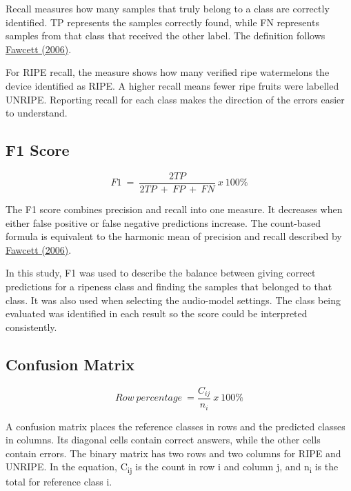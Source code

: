 \begin{thesisprose}
Recall measures how many samples that truly belong to a class are correctly identified. TP represents the samples correctly found, while FN represents samples from that class that received the other label. The definition follows \hyperlink{cite.fawcett2006}{Fawcett (2006)}.

For RIPE recall, the measure shows how many verified ripe watermelons the device identified as RIPE. A higher recall means fewer ripe fruits were labelled UNRIPE. Reporting recall for each class makes the direction of the errors easier to understand.

\subsection{F1 Score}

\begin{equation}
  F1\  = \ \frac{2TP}{2TP\  + \ FP\  + \ FN}\ x\ 100\%
  \label{eq:formula-612}
\end{equation}

The F1 score combines precision and recall into one measure. It decreases when either false positive or false negative predictions increase. The count-based formula is equivalent to the harmonic mean of precision and recall described by \hyperlink{cite.fawcett2006}{Fawcett (2006)}.

In this study, F1 was used to describe the balance between giving correct predictions for a ripeness class and finding the samples that belonged to that class. It was also used when selecting the audio-model settings. The class being evaluated was identified in each result so the score could be interpreted consistently.

\subsection{Confusion Matrix}

\begin{equation}
  Row\ percentage\  = \frac{C_{ij}}{n_{i}}\ x\ 100\%
  \label{eq:formula-616}
\end{equation}

A confusion matrix places the reference classes in rows and the predicted classes in columns. Its diagonal cells contain correct answers, while the other cells contain errors. The binary matrix has two rows and two columns for RIPE and UNRIPE. In the equation, C\textsubscript{ij} is the count in row i and column j, and n\textsubscript{i} is the total for reference class i.


\end{thesisprose}
